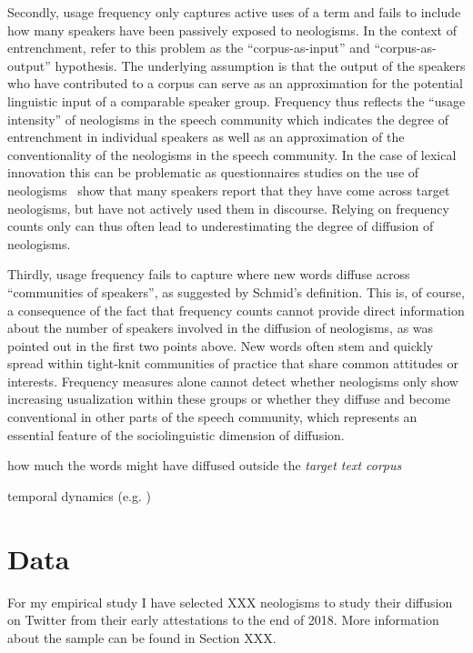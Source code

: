 \documentclass[draft, a4paper, abstract=on]{scrartcl}
\begin{document}
Secondly, usage frequency only captures active uses of a term and fails to include how many speakers have been passively exposed to neologisms. In the context of entrenchment, \textcite{Stefanowitsch2017CorpusbasedPerspective} refer to this problem as the \enquote{corpus-as-input} and \enquote{corpus-as-output} hypothesis. The underlying assumption is that the output of the speakers who have contributed to a corpus can serve as an approximation for the potential linguistic input of a comparable speaker group. Frequency thus reflects the \enquote{usage intensity} of neologisms in the speech community which indicates the degree of entrenchment in individual speakers as well as an approximation of the conventionality of the neologisms in the speech community. In the case of lexical innovation this can be problematic as questionnaires studies on the use of neologisms~\parencite{Kerremans2015WebNew} show that many speakers report that they have come across target neologisms, but have not actively used them in discourse. Relying on frequency counts only can thus often lead to underestimating the degree of diffusion of neologisms.

Thirdly, usage frequency fails to capture where new words diffuse across \enquote{communities of speakers}, as suggested by Schmid's definition. This is, of course, a consequence of the fact that frequency counts cannot provide direct information about the number of speakers involved in the diffusion of neologisms, as was pointed out in the first two points above. New words often stem and quickly spread within tight-knit communities of practice that share common attitudes or interests. Frequency measures alone cannot detect whether neologisms only show increasing usualization within these groups or whether they diffuse and become conventional in other parts of the speech community, which represents an essential feature of the sociolinguistic dimension of diffusion.


how much the words might have diffused outside the \emph{target text corpus}

temporal dynamics (e.g. )

\section{Data}

For my empirical study I have selected XXX neologisms to study their diffusion on Twitter from their early attestations to the end of 2018. More information about the sample can be found in Section XXX.
\end{document}
